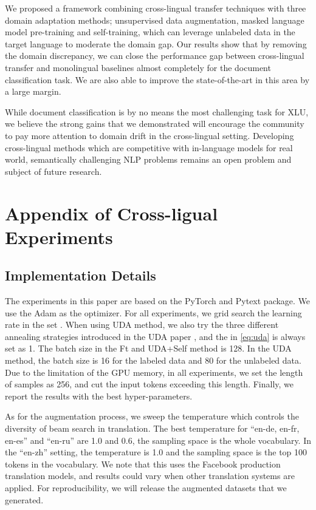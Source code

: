 \documentclass{article} \usepackage{iclr2020_conference,times}
\begin{document}
We proposed a framework combining cross-lingual transfer techniques with three domain adaptation methods; unsupervised data augmentation, masked language model pre-training and self-training, which can leverage unlabeled data in the target language to moderate the domain gap.  Our results show that by removing the domain discrepancy, we can close the performance gap between cross-lingual transfer and monolingual baselines almost completely for the document classification task.  We are also able to improve the state-of-the-art in this area by a large margin.  

While document classification is by no means the most challenging task for XLU, we believe the strong gains that we demonstrated will encourage the community to pay more attention to domain drift in the cross-lingual setting.  Developing cross-lingual methods which are competitive with in-language models for real world, semantically challenging NLP problems remains an open problem and subject of future research. 

\appendix

\section{Appendix of Cross-ligual Experiments}


\subsection{Implementation Details}
\label{app:details}

The experiments in this paper are based on the PyTorch \citep{paszke2017automatic} and Pytext \citep{aly2018pytext} package. We use the Adam \citep{kingma2014adam} as the optimizer. 
For all experiments, we grid search the learning rate in the set . 
When using UDA method, we also try the three different annealing strategies introduced in the UDA paper \citep{xie2019unsupervised}, and the  in \eqref{eq:uda} is always set as 1. 
The batch size in the Ft and UDA+Self method is 128. In the UDA method, the batch size is 16 for the labeled data and 80 for the unlabeled data. 
Due to the limitation of the GPU memory, in all experiments, we set the length of samples as 256, and cut the input tokens exceeding this length. 
Finally, we report the results with the best hyper-parameters.

As for the augmentation process, we sweep the temperature which controls the diversity of beam search in translation. 
The best temperature for ``en-de, en-fr, en-es'' and  ``en-ru'' are 1.0 and 0.6, the sampling space is the whole vocabulary. 
In the ``en-zh'' setting, the temperature is 1.0 and the sampling space is the top 100 tokens in the vocabulary. 
We note that this uses the Facebook production translation models, and results could vary when other translation systems are applied.  For reproducibility, we will release the augmented datasets that we generated.
\end{document}
